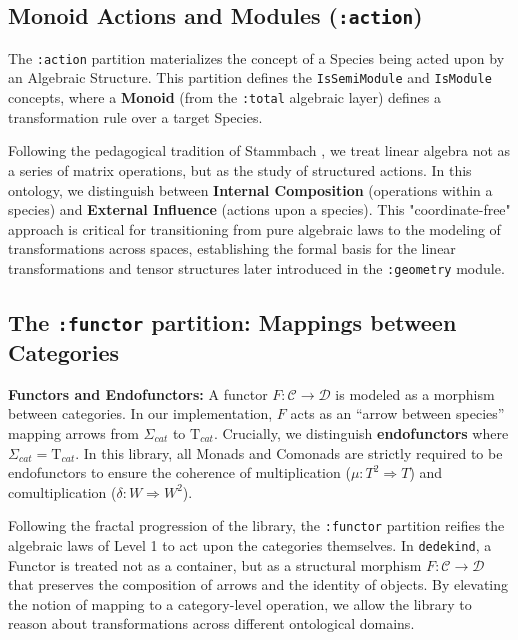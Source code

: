 \documentclass[11pt, a4paper]{report}
\begin{document}
\subsection{Monoid Actions and Modules (\texttt{:action})}

The \texttt{:action} partition materializes the concept of a Species being acted upon by an Algebraic Structure. This partition defines the \texttt{IsSemiModule} and \texttt{IsModule} concepts, where a \textbf{Monoid} (from the \texttt{:total} algebraic layer) defines a transformation rule over a target Species. 

Following the pedagogical tradition of Stammbach \cite{stammbach1994lineare}, we treat linear algebra not as a series of matrix operations, but as the study of structured actions.
In this ontology, we distinguish between \textbf{Internal Composition} (operations within a species) and \textbf{External Influence} (actions upon a species).
This "coordinate-free" approach \cite{halmos1958finite} is critical for transitioning from pure algebraic laws to the modeling of transformations across spaces, establishing the formal basis for the linear transformations and tensor structures later introduced in the \texttt{:geometry} module.



\subsection{The \texttt{:functor} partition: Mappings between Categories}


\textbf{Functors and Endofunctors:} A functor $F: \mathcal{C} \to \mathcal{D}$ is modeled as a morphism between categories. In our implementation, $F$ acts as an ``arrow between species'' mapping arrows from $\Sigma_{cat}$ to $\mathrm{T}_{cat}$. Crucially, we distinguish \textbf{endofunctors} where $\Sigma_{cat} = \mathrm{T}_{cat}$. In this library, all Monads and Comonads are strictly required to be endofunctors to ensure the coherence of multiplication ($\mu: T^2 \Rightarrow T$) and comultiplication ($\delta: W \Rightarrow W^2$).


Following the fractal progression of the library, the \texttt{:functor} partition reifies the algebraic laws of Level 1 to act upon the categories themselves. In \texttt{dedekind}, a Functor is treated not as a container, but as a structural morphism $F: \mathcal{C} \to \mathcal{D}$ that preserves the composition of arrows and the identity of objects. By elevating the notion of mapping to a category-level operation, we allow the library to reason about transformations across different ontological domains.
\end{document}

